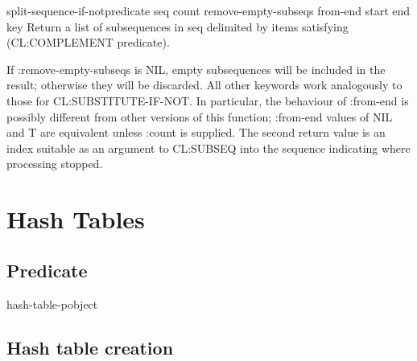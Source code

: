 \documentclass[10pt,english]{book}
\begin{document}
\begin{function}{split-sequence-if-not}{predicate seq \key count
    remove-empty-subseqs from-end start end key}
  Return a list of subsequences in seq delimited by items satisfying
  (CL:COMPLEMENT predicate).

  If :remove-empty-subseqs is NIL, empty subsequences will be included
  in the result; otherwise they will be discarded. All other keywords
  work analogously to those for CL:SUBSTITUTE-IF-NOT. In particular,
  the behaviour of :from-end is possibly different from other versions
  of this function; :from-end values of NIL and T are equivalent
  unless :count is supplied. The second return value is an index
  suitable as an argument to CL:SUBSEQ into the sequence indicating
  where processing stopped.
\end{function}


\chapter{Hash Tables}

\section{Predicate}
\label{sec:hashtable-predicate}

\begin{function}{hash-table-p}{object}
  
\end{function}

\section{Hash table creation}
\label{sec:hash-table-creation}
\end{document}
